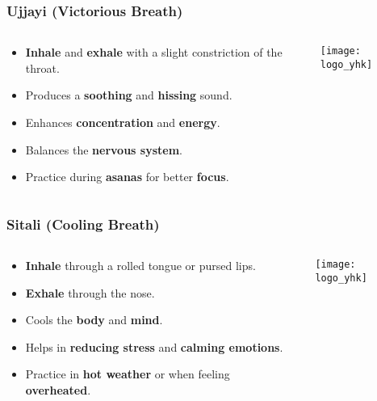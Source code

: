 \begin{frame}[fragile]\frametitle{Ujjayi (Victorious Breath)}
\begin{columns}
    \begin{column}[T]{0.5\linewidth}
      \begin{itemize}
        \item \textbf{Inhale} and \textbf{exhale} with a slight constriction of the throat.
        \item Produces a \textbf{soothing} and \textbf{hissing} sound.
        \item Enhances \textbf{concentration} and \textbf{energy}.
        \item Balances the \textbf{nervous system}.
        \item Practice during \textbf{asanas} for better \textbf{focus}.
      \end{itemize}
    \end{column}
    \begin{column}[T]{0.5\linewidth}
        \begin{center}
        \texttt{[image: logo\_yhk]}
        \end{center}	
    \end{column}
\end{columns}
\end{frame}

\begin{frame}[fragile]\frametitle{Sitali (Cooling Breath)}
\begin{columns}
    \begin{column}[T]{0.5\linewidth}
      \begin{itemize}
        \item \textbf{Inhale} through a rolled tongue or pursed lips.
        \item \textbf{Exhale} through the nose.
        \item Cools the \textbf{body} and \textbf{mind}.
        \item Helps in \textbf{reducing stress} and \textbf{calming emotions}.
        \item Practice in \textbf{hot weather} or when feeling \textbf{overheated}.
      \end{itemize}
    \end{column}
    \begin{column}[T]{0.5\linewidth}
        \begin{center}
        \texttt{[image: logo\_yhk]}
        \end{center}	
    \end{column}
\end{columns}
\end{frame}



